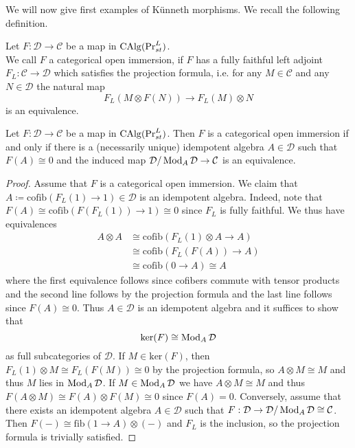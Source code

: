 We will now give first examples of Künneth morphisms. We recall the following definition.
\begin{definition}\Cite[Lemma 6.4, Proposition 6.5]{clausen2022condensed}\label{abstractdef of open and closed in Sym}
Let $F : \mathcal{D} \to \mathcal{C}$ be a map in $\operatorname{CAlg}(\Pr_{st}^L)$.  \\
We call $F$ a categorical open immersion, if $F$ has a fully faithful left adjoint $F_L: \mathcal{C} \to \mathcal{D}$ which satisfies the projection formula, i.e.  for any $M\in \mathcal{C}$ and any $N\in \mathcal{D}$ the natural map 
    \[
   F_L(M\otimes F(N)) \to  F_L(M) \otimes N
    \]
    is an equivalence. 

\end{definition}
\begin{proposition}\Cite[Proposition 6.5]{clausen2022condensed}\label{alternative defclosed open inSym}
Let $F : \mathcal{D} \to \mathcal{C}$ be a map in $\operatorname{CAlg}(\Pr_{st}^L)$. Then $F$ is a categorical open immersion if and only if there is a (necessarily unique) idempotent algebra $A\in \mathcal{D}$ such that $F(A)\cong 0$ and the induced map $\mathcal{D}/\operatorname{Mod}_A\mathcal{D} \to \mathcal{C}$ is an equivalence.

\end{proposition}
\begin{proof}
  Assume that $F$ is a categorical open immersion. We claim that $A\coloneqq \mathrm{cofib}(F_L(1) \to 1)\in \mathcal{D}$ is an idempotent algebra. Indeed, note that $F(A)\cong \mathrm{cofib}(F (F_L(1))\to 1)\cong 0$ since $F_L$ is fully faithful.  We thus have equivalences
\begin{align*}\label{idempotetn algebra etc}
A\otimes A & \cong \mathrm{cofib}(F_L(1)\otimes A \to A)\\
& \cong \mathrm{cofib}(F_L(F(A)) \to A) \\
& \cong \mathrm{cofib}(0 \to A)\cong A
\end{align*}
where the first equivalence follows since cofibers commute with tensor products and the second line follows by the projection formula and the last line follows since $F(A)\cong 0$. Thus $A\in \mathcal{D}$ is an idempotent algebra and it suffices to show that
\[
\mathrm{ker}(F)\cong \operatorname{Mod}_A\mathcal{D}
\]
as full subcategories of $\mathcal{D}$. If $M\in \mathrm{ker}(F)$, then $F_L(1)\otimes M \cong F_L (F(M)) \cong 0$ by the projection formula, so $A \otimes M\cong M $ and thus $M$ lies in $\operatorname{Mod}_A\mathcal{D}$. If $M\in \operatorname{Mod}_A\mathcal{D}$ we have $A \otimes M \cong M$ and thus $F(A \otimes M) \cong F(A) \otimes F(M) \cong 0$ since $F(A)=0$. Conversely, assume that there exists an idempotent algebra $A\in \mathcal{D}$ such that $F :\mathcal{D} \to \mathcal{D}/\operatorname{Mod}_A\mathcal{D} \cong \mathcal{C}$. Then $F(-)\cong \mathrm{fib}(1\to A)\otimes (-) $ and  $F_L$ is the inclusion, so the projection formula is trivially satisfied.
\end{proof}
